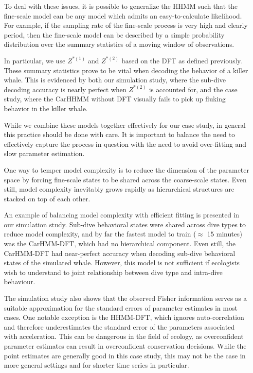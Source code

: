 To deal with these issues, it is possible to generalize the HHMM such that the fine-scale model can be any model which admits an easy-to-calculate likelihood. For example, if the sampling rate of the fine-scale process is very high and clearly period, then the fine-scale model can be described by a simple probability distribution over the summary statistics of a moving window of observations. 

In particular, we use $Z^{*(1)}$ and $Z^{*(2)}$ based on the DFT as defined previously. These summary statistics prove to be vital when decoding the behavior of a killer whale. This is evidenced by both our simulation study, where the sub-dive decoding accuracy is nearly perfect when $Z^{*(2)}$ is accounted for, and the case study, where the CarHHMM without DFT visually fails to pick up fluking behavior in the killer whale.

While we combine these models together effectively for our case study, in general this practice should be done with care. It is important to balance the need to effectively capture the process in question with the need to avoid over-fitting and slow parameter estimation.

One way to temper model complexity is to reduce the dimension of the parameter space by forcing fine-scale states to be shared across the coarse-scale states. Even still, model complexity inevitably grows rapidly as hierarchical structures are stacked on top of each other.

An example of balancing model complexity with efficient fitting is presented in our simulation study. Sub-dive behavioral states were shared across dive types to reduce model complexity, and by far the fastest model to train ($\approx$ 15 minutes) was the CarHMM-DFT, which had no hierarchical component. Even still, the CarHMM-DFT had near-perfect accuracy when decoding sub-dive behavioral states of the simulated whale.
However, this model is not sufficient if ecologists wish to understand to joint relationship between dive type and intra-dive behaviour. 

The simulation study also shows that the observed Fisher information serves as a suitable approximation for the standard errors of parameter estimates in most cases. One notable exception is the HHMM-DFT, which ignores auto-correlation and therefore underestimates the standard error of the parameters associated with acceleration. This can be dangerous in the field of ecology, as overconfident parameter estimates can result in overconfident conservation decisions. While the point estimates are generally good in this case study, this may not be the case in more general settings and for shorter time series in particular.

